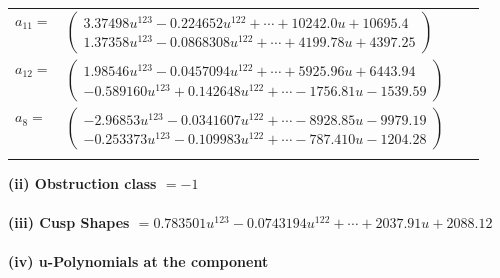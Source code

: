 \documentclass[1p]{elsarticle_modified}
\theoremstyle{definition}
\begin{document}
\begin{tabular}{m{7pt} m{180pt} m{7pt} m{180pt} }
\flushright $a_{11}=$&$\begin{pmatrix}3.37498 u^{123}-0.224652 u^{122}+\cdots+10242.0 u+10695.4\\1.37358 u^{123}-0.0868308 u^{122}+\cdots+4199.78 u+4397.25\end{pmatrix}$ \\
\flushright $a_{12}=$&$\begin{pmatrix}1.98546 u^{123}-0.0457094 u^{122}+\cdots+5925.96 u+6443.94\\-0.589160 u^{123}+0.142648 u^{122}+\cdots-1756.81 u-1539.59\end{pmatrix}$ \\
\flushright $a_{8}=$&$\begin{pmatrix}-2.96853 u^{123}-0.0341607 u^{122}+\cdots-8928.85 u-9979.19\\-0.253373 u^{123}-0.109983 u^{122}+\cdots-787.410 u-1204.28\end{pmatrix}$\\&\end{tabular}
\flushleft \textbf{(ii) Obstruction class $= -1$}\\~\\
\flushleft \textbf{(iii) Cusp Shapes $= 0.783501 u^{123}-0.0743194 u^{122}+\cdots+2037.91 u+2088.12$}\\~\\
\newpage\renewcommand{\arraystretch}{1}
\flushleft \textbf{(iv) u-Polynomials at the component}\newline \\
\end{document}
